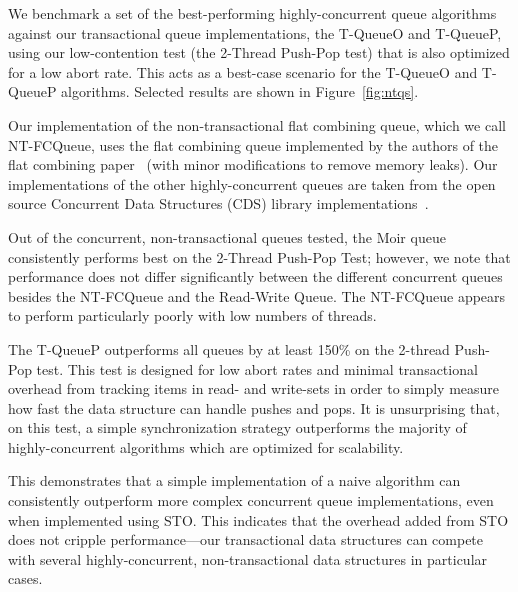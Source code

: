 We benchmark a set of the best-performing highly-concurrent queue algorithms against our transactional queue implementations, the T-QueueO and T-QueueP, using our low-contention test (the 2-Thread Push-Pop test) that is also optimized for a low abort rate. This acts as a best-case scenario for the T-QueueO and T-QueueP algorithms. Selected results are shown in Figure~\ref{fig:ntqs}.

Our implementation of the non-transactional flat combining queue, which we call NT-FCQueue, uses the flat combining queue implemented by the authors of the flat combining paper~\cite{flatcombining} (with minor modifications to remove memory leaks). Our implementations of the other highly-concurrent queues are taken from the open source Concurrent Data Structures (CDS) library implementations~\cite{libcds}. 

Out of the concurrent, non-transactional queues tested, the Moir queue~\cite{queue2} consistently performs best on the 2-Thread Push-Pop Test; however, we note that performance does not differ significantly between the different concurrent queues besides the NT-FCQueue and the Read-Write Queue. The NT-FCQueue appears to perform particularly poorly with low numbers of threads. 

The T-QueueP outperforms all queues by at least 150\% on the 2-thread Push-Pop test. This test is designed for low abort rates and minimal transactional overhead from tracking items in read- and write-sets in order to simply measure how fast the data structure can handle pushes and pops. It is unsurprising that, on this test, a simple synchronization strategy outperforms the majority of highly-concurrent algorithms which are optimized for scalability. 

This demonstrates that a simple implementation of a naive algorithm can consistently outperform more complex concurrent queue implementations, even when implemented using STO. This indicates that the overhead added from STO does not cripple performance---our transactional data structures can compete with several highly-concurrent, non-transactional data structures in particular cases. 

\vspace{12pt}
\noindent{}

